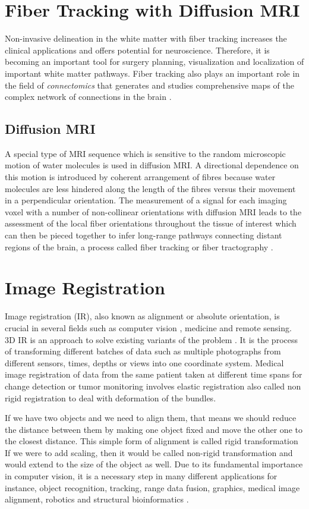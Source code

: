 \documentclass[../structure.tex]{subfiles}
\begin{document}
\section{Fiber Tracking with Diffusion MRI}
Non-invasive delineation in the white matter with fiber tracking increases the clinical applications and offers potential for neuroscience. Therefore, it is becoming an important tool for surgery planning, visualization and localization of important white matter pathways. Fiber tracking also plays an important role in the field of \textit{connectomics} that generates and studies comprehensive maps of the complex network of connections in the brain \cite{Jeurissen2017}.

\subsection{Diffusion MRI}
A special type of MRI sequence which is sensitive to the random microscopic motion of water molecules is used in diffusion MRI. A directional dependence on this motion is introduced by coherent arrangement of fibres because water molecules are less hindered along the length of the fibres versus their movement in a perpendicular orientation. The measurement of a signal for each imaging voxel with a number of non-collinear orientations with diffusion MRI leads to the assessment of the local fiber orientations throughout the tissue of interest which can then be pieced together to infer long-range pathways connecting distant regions of the brain, a process called fiber tracking or fiber tractography \cite{Jeurissen2017}.

\section{Image Registration}
Image registration (IR), also known as alignment or absolute orientation, is crucial in several fields such as computer vision , medicine and remote sensing. 3D IR is an approach to solve existing variants of the problem \cite{Cordon2006}. It is the process of transforming different batches of data such as multiple photographs from different sensors, times, depths or views into one coordinate system. Medical image registration of data from the same patient taken at different time spans for change detection or tumor monitoring involves elastic registration also called non rigid registration to deal with deformation of the bundles.

If we have two objects and we need to align them, that means we should reduce the distance between them by making one object fixed and move the other one to the closest distance. This simple form of alignment is called rigid transformation If we were to add scaling, then it would be called non-rigid transformation and would extend to the size of the object as well. Due to its fundamental importance in computer vision, it is a necessary step in many different applications for instance, object recognition, tracking, range data fusion, graphics, medical image alignment, robotics and structural bioinformatics \cite{Li2007}.
\end{document}
